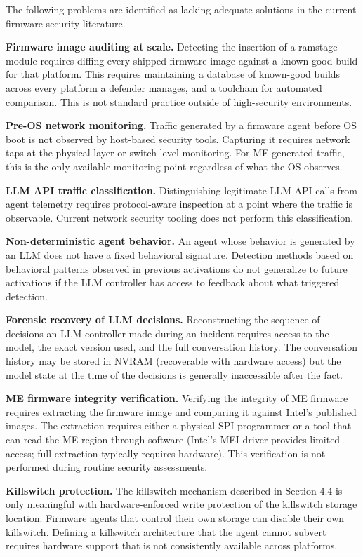 \documentclass[11pt,a4paper]{article}
\begin{document}
The following problems are identified as lacking adequate solutions in the current firmware security literature.

\textbf{Firmware image auditing at scale.} Detecting the insertion of a ramstage module requires diffing every shipped firmware image against a known-good build for that platform. This requires maintaining a database of known-good builds across every platform a defender manages, and a toolchain for automated comparison. This is not standard practice outside of high-security environments.

\textbf{Pre-OS network monitoring.} Traffic generated by a firmware agent before OS boot is not observed by host-based security tools. Capturing it requires network taps at the physical layer or switch-level monitoring. For ME-generated traffic, this is the only available monitoring point regardless of what the OS observes.

\textbf{LLM API traffic classification.} Distinguishing legitimate LLM API calls from agent telemetry requires protocol-aware inspection at a point where the traffic is observable. Current network security tooling does not perform this classification.

\textbf{Non-deterministic agent behavior.} An agent whose behavior is generated by an LLM does not have a fixed behavioral signature. Detection methods based on behavioral patterns observed in previous activations do not generalize to future activations if the LLM controller has access to feedback about what triggered detection.

\textbf{Forensic recovery of LLM decisions.} Reconstructing the sequence of decisions an LLM controller made during an incident requires access to the model, the exact version used, and the full conversation history. The conversation history may be stored in NVRAM (recoverable with hardware access) but the model state at the time of the decisions is generally inaccessible after the fact.

\textbf{ME firmware integrity verification.} Verifying the integrity of ME firmware requires extracting the firmware image and comparing it against Intel's published images. The extraction requires either a physical SPI programmer or a tool that can read the ME region through software (Intel's MEI driver provides limited access; full extraction typically requires hardware). This verification is not performed during routine security assessments.

\textbf{Killswitch protection.} The killswitch mechanism described in Section 4.4 is only meaningful with hardware-enforced write protection of the killswitch storage location. Firmware agents that control their own storage can disable their own killswitch. Defining a killswitch architecture that the agent cannot subvert requires hardware support that is not consistently available across platforms.
\end{document}
